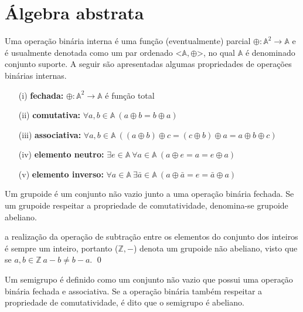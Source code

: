 \pagebreak
\section{Álgebra abstrata}
\label{ap:abstract_algebra}
Uma operação binária interna é uma função (eventualmente) parcial $\oplus:\mathbb{A}^{2}\rightarrow\mathbb{A}$ e é usualmente denotada como um par ordenado <$\mathbb{A}, \oplus$>, no qual $\mathbb{A}$ é denominado conjunto suporte. A seguir são apresentadas algumas propriedades de operações binárias internas.

\begin{itemize}
    \item[(i)] \textbf{fechada:} $\oplus:\mathbb{A}^{2}\rightarrow\mathbb{A}$ é função total
	\item[(ii)] \textbf{comutativa:} $\forall a,b \in \mathbb{A}\:(a \oplus b = b \oplus a)$
	\item[(iii)] \textbf{associativa:} $\forall a,b \in \mathbb{A}\:((a \oplus b) \oplus c = (c \oplus b) \oplus a = a \oplus b \oplus c)$
	\item[(iv)] \textbf{elemento neutro:} $\exists e \in \mathbb{A}\:\forall a \in \mathbb{A}\:(a \oplus e = a = e \oplus a)$
	\item[(v)] \textbf{elemento inverso:} $\forall a \in \mathbb{A}\:\exists \bar{a} \in \mathbb{A}\:(a \oplus \bar{a} = e = \bar{a} \oplus a)$
\end{itemize}

\begin{definition}[grupoide]
    Um grupoide é um conjunto não vazio junto a uma operação binária fechada. Se um grupoide respeitar a propriedade de comutatividade, denomina-se grupoide abeliano.
\end{definition}

    \begin{exemplo}
         a realização da operação de subtração entre os elementos do conjunto dos inteiros é sempre um inteiro, portanto ($\mathbb{Z},-$) denota um grupoide não abeliano, visto que se $a,b \in \mathbb{Z}\ a - b \neq b - a$. 
    \qed
    \end{exemplo}

\begin{definition}[semigrupo]
    Um semigrupo é definido como um conjunto não vazio que possui uma operação binária fechada e associativa. Se a operação binária também respeitar a propriedade de comutatividade, é dito que o semigrupo é abeliano.
\end{definition}

